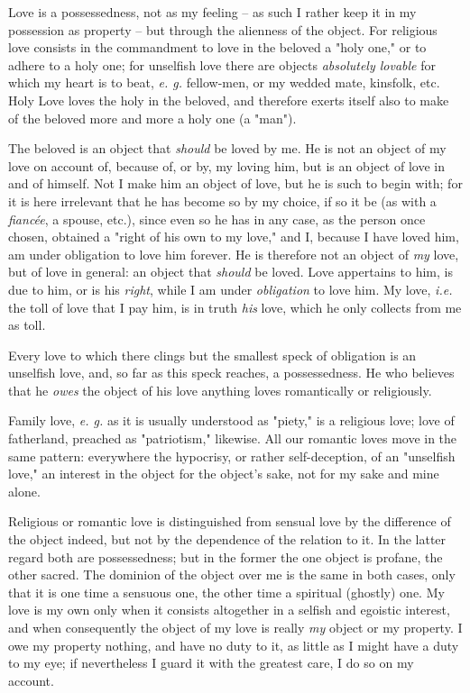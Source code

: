 \documentclass[a4paper]{book}
\begin{document}
Love is a possessedness, not as my feeling -- as such I rather keep it in my 
possession as property -- but through the alienness of the object. For 
religious love consists in the commandment to love in the beloved a "{}holy 
one,"{} or to adhere to a holy one; for unselfish love there are objects 
\textit{absolutely lovable} for which my heart is to beat, \textit{e. g.} 
fellow-men, or my wedded mate, kinsfolk, etc. Holy Love loves the holy in the 
beloved, and therefore exerts itself also to make of the beloved more and more 
a holy one (a "{}man"{}).

The beloved is an object that \textit{should} be loved by me. He is not an 
object of my love on account of, because of, or by, my loving him, but is an 
object of love in and of himself. Not I make him an object of love, but he is 
such to begin with; for it is here irrelevant that he has become so by my 
choice, if so it be (as with a \textit{fianc\'ee}, a spouse, etc.), since even 
so he has in any case, as the person once chosen, obtained a "{}right of his 
own to my love,"{} and I, because I have loved him, am under obligation to 
love him forever. He is therefore not an object of \textit{my} love, but of 
love in general: an object that \textit{should} be loved. Love appertains to 
him, is due to him, or is his \textit{right}, while I am under 
\textit{obligation} to love him. My love, \textit{i.e.} the toll of love that 
I pay him, is in truth \textit{his} love, which he only collects from me as 
toll.

Every love to which there clings but the smallest speck of obligation is an 
unselfish love, and, so far as this speck reaches, a possessedness. He who 
believes that he \textit{owes} the object of his love anything loves 
romantically or religiously.

Family love, \textit{e. g.} as it is usually understood as "{}piety,"{} is a 
religious love; love of fatherland, preached as "{}patriotism,"{} likewise. 
All our romantic loves move in the same pattern: everywhere the hypocrisy, or 
rather self-deception, of an "{}unselfish love,"{} an interest in the object 
for the object's sake, not for my sake and mine alone.

Religious or romantic love is distinguished from sensual love by the 
difference of the object indeed, but not by the dependence of the relation to 
it. In the latter regard both are possessedness; but in the former the one 
object is profane, the other sacred. The dominion of the object over me is the 
same in both cases, only that it is one time a sensuous one, the other time a 
spiritual (ghostly) one. My love is my own only when it consists altogether in 
a selfish and egoistic interest, and when consequently the object of my love 
is really \textit{my} object or my property. I owe my property nothing, and 
have no duty to it, as little as I might have a duty to my eye; if 
nevertheless I guard it with the greatest care, I do so on my account.
\end{document}
